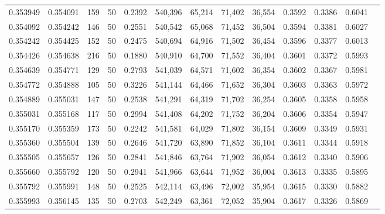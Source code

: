 \begin{tabular}{rrrrrrrrrrrrr}
0.353949 & 0.354091 &   159 &  50 &                                     0.2392 & 540,396 &  65,214 &  71,402 &  36,554 & 0.3592 & 0.3386 & 0.6041 \\
0.354092 & 0.354242 &   146 &  50 &                                     0.2551 & 540,542 &  65,068 &  71,452 &  36,504 & 0.3594 & 0.3381 & 0.6027 \\
0.354242 & 0.354425 &   152 &  50 &                                     0.2475 & 540,694 &  64,916 &  71,502 &  36,454 & 0.3596 & 0.3377 & 0.6013 \\
0.354426 & 0.354638 &   216 &  50 &                                     0.1880 & 540,910 &  64,700 &  71,552 &  36,404 & 0.3601 & 0.3372 & 0.5993 \\
0.354639 & 0.354771 &   129 &  50 &                                     0.2793 & 541,039 &  64,571 &  71,602 &  36,354 & 0.3602 & 0.3367 & 0.5981 \\
0.354772 & 0.354888 &   105 &  50 &                                     0.3226 & 541,144 &  64,466 &  71,652 &  36,304 & 0.3603 & 0.3363 & 0.5972 \\
0.354889 & 0.355031 &   147 &  50 &                                     0.2538 & 541,291 &  64,319 &  71,702 &  36,254 & 0.3605 & 0.3358 & 0.5958 \\
0.355031 & 0.355168 &   117 &  50 &                                     0.2994 & 541,408 &  64,202 &  71,752 &  36,204 & 0.3606 & 0.3354 & 0.5947 \\
0.355170 & 0.355359 &   173 &  50 &                                     0.2242 & 541,581 &  64,029 &  71,802 &  36,154 & 0.3609 & 0.3349 & 0.5931 \\
0.355360 & 0.355504 &   139 &  50 &                                     0.2646 & 541,720 &  63,890 &  71,852 &  36,104 & 0.3611 & 0.3344 & 0.5918 \\
0.355505 & 0.355657 &   126 &  50 &                                     0.2841 & 541,846 &  63,764 &  71,902 &  36,054 & 0.3612 & 0.3340 & 0.5906 \\
0.355660 & 0.355792 &   120 &  50 &                                     0.2941 & 541,966 &  63,644 &  71,952 &  36,004 & 0.3613 & 0.3335 & 0.5895 \\
0.355792 & 0.355991 &   148 &  50 &                                     0.2525 & 542,114 &  63,496 &  72,002 &  35,954 & 0.3615 & 0.3330 & 0.5882 \\
0.355993 & 0.356145 &   135 &  50 &                                     0.2703 & 542,249 &  63,361 &  72,052 &  35,904 & 0.3617 & 0.3326 & 0.5869 \\

\end{tabular}
